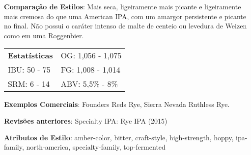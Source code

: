 \textbf{Comparação de Estilos}: Mais seca, ligeiramente mais picante e ligeiramente mais cremosa do que uma American IPA, com um amargor persistente e picante no final. Não possui o caráter intenso de malte de centeio ou levedura de Weizen como em uma Roggenbier.

\begin{tabular}{@{}p{35mm}p{35mm}@{}}
  \textbf{Estatísticas} & OG: 1,056 - 1,075 \\
  IBU: 50 - 75  & FG: 1,008 - 1,014 \\
  SRM: 6 - 14  & ABV: 5,5\% - 8\%
\end{tabular}

\textbf{Exemplos Comerciais}: Founders Reds Rye, Sierra Nevada Ruthless Rye.

\textbf{Revisões anteriores}: Specialty IPA: Rye IPA (2015)

\textbf{Atributos de Estilo}: amber-color, bitter, craft-style, high-strength, hoppy, ipa-family, north-america, specialty-family, top-fermented
